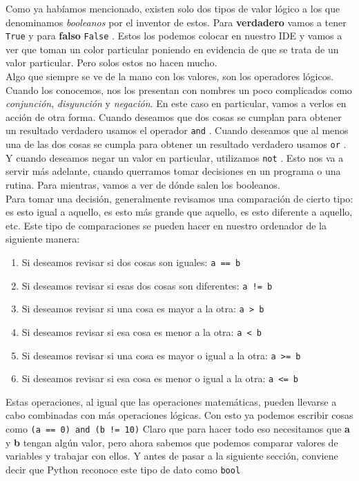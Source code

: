 \documentclass[10pt,letterpaper]{article}
\newcommand{\inlinecode}[1]{
\colorbox{light-gray}{\texttt{#1}}
}
\begin{document}
Como ya hab\'iamos mencionado, existen solo dos tipos de valor l\'ogico a los que denominamos \emph{booleanos} por el inventor de estos. Para \textbf{verdadero} vamos a tener \inlinecode{True} y para \textbf{falso} \inlinecode{False}. Estos los podemos colocar en nuestro IDE y vamos a ver que toman un color particular poniendo en evidencia de que se trata de un valor particular. Pero solos estos no hacen mucho.\\

Algo que siempre se ve de la mano con los valores, son los operadores l\'ogicos. Cuando los conocemos, nos los presentan con nombres un poco complicados como \emph{conjunci\'on}, \emph{disyunci\'on} y \emph{negaci\'on}. En este caso en particular, vamos a verlos en acci\'on de otra forma. Cuando deseamos que dos cosas se cumplan para obtener un resultado verdadero usamos el operador \inlinecode{and}. Cuando deseamos que al menos una de las dos cosas se cumpla para obtener un resultado verdadero usamos \inlinecode{or}. Y cuando deseamos negar un valor en particular, utilizamos \inlinecode{not}. Esto nos va a servir m\'as adelante, cuando querramos tomar decisiones en un programa o una rutina. Para mientras, vamos a ver de d\'onde salen los booleanos.\\

Para tomar una decisi\'on, generalmente revisamos una comparaci\'on de cierto tipo: es esto igual a aquello, es esto m\'as grande que aquello, es esto diferente a aquello, etc. Este tipo de comparaciones se pueden hacer en nuestro ordenador de la siguiente manera:

\begin{enumerate}
\item Si deseamos revisar si dos cosas son iguales: \inlinecode{a == b}
\item Si deseamos revisar si esas dos cosas son diferentes: \inlinecode{a != b}
\item Si deseamos revisar si una cosa es mayor a la otra: \inlinecode{a >\ b}
\item Si deseamos revisar si esa cosa es menor a la otra: \inlinecode{a <\ b}
\item Si deseamos revisar si una cosa es mayor o igual a la otra: \inlinecode{a >= b}
\item Si deseamos revisar si esa cosa es menor o igual a la otra: \inlinecode{a <= b}
\end{enumerate}

Estas operaciones, al igual que las operaciones matem\'aticas, pueden llevarse a cabo combinadas con m\'as operaciones l\'ogicas. Con esto ya podemos escribir cosas como \inlinecode{(a == 0) and (b != 10)} Claro que para hacer todo eso necesitamos que \textbf{a} y \textbf{b} tengan alg\'un valor, pero ahora sabemos que podemos comparar valores de variables y trabajar con ellos. Y antes de pasar a la siguiente secci\'on, conviene decir que Python reconoce este tipo de dato como \inlinecode{bool}
\end{document}
